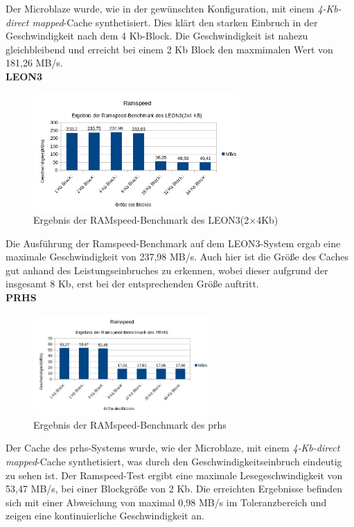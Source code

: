 Der Microblaze wurde, wie in der gewünschten Konfiguration, mit einem \emph{4-Kb-direct mapped}-Cache synthetisiert. Dies klärt den starken Einbruch in der Geschwindigkeit nach dem 4 Kb-Block.
Die Geschwindigkeit ist nahezu gleichbleibend und erreicht bei einem 2 Kb Block den maxmimalen Wert von 181,26 MB/s.\\

\textbf{LEON3}

\begin{figure}[H]
\centering
\includegraphics[width=0.7\textwidth]{Hauptteil/ramspeedleon3.png}
\caption{Ergebnis der RAMspeed-Benchmark des LEON3(2\(\times\)4Kb)}
\label{fig:ramspeedleon3}
\end{figure}

Die Ausführung der Ramspeed-Benchmark auf dem LEON3-System ergab eine maximale Geschwindigkeit von 237,98 MB/s. Auch hier ist die Größe des Caches gut anhand des Leistungseinbruches zu erkennen,
wobei dieser aufgrund der insgesamt 8 Kb, erst bei der entsprechenden Größe auftritt.\\

\textbf{PRHS}

\begin{figure}[H]
\centering
\includegraphics[width=0.6\textwidth]{Hauptteil/ramspeedprhs.png}
\caption{Ergebnis der RAMspeed-Benchmark des \ac{prhs}}
\label{fig:ramspeedprhs}
\end{figure}

Der Cache des \ac{prhs}-Systems wurde, wie der Microblaze, mit einem \emph{4-Kb-direct mapped}-Cache synthetisiert, was durch den Geschwindigkeitseinbruch eindeutig zu sehen ist. Der
Ramspeed-Test ergibt eine maximale Lesegeschwindigkeit von 53,47 MB/s, bei einer Blockgröße von 2 Kb. Die erreichten Ergebnisse befinden sich mit einer Abweichung von maximal 0,98 MB/s
im Toleranzbereich und zeigen eine kontinuierliche Geschwindigkeit an.\\

